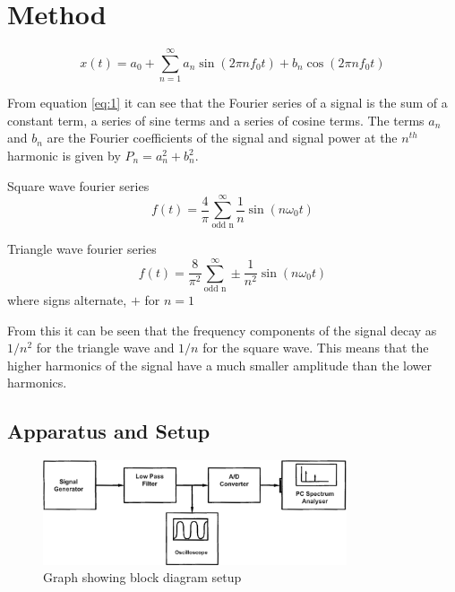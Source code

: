 \documentclass[12pt]{article}
\begin{document}
\section{Method}

\begin{equation}
    x(t) = a_0 + \sum_{n=1}^{\infty} a_n \sin(2\pi n f_0 t) + b_n \cos(2\pi n f_0 t)
    \label{eq:1}
\end{equation}

From equation \ref{eq:1} it can see that the Fourier series of a signal is the sum of a constant term, a series of sine terms and a series of cosine terms. 
The terms $a_n$ and $b_n$ are the Fourier coefficients of the signal and signal power at the $n^{th}$ harmonic is given by $P_n = a_n^2 + b_n^2$.

Square wave fourier series
\begin{equation}
    f(t) = \frac{4}{\pi} \sum_{\text{odd n}}^{\infty} \frac{1}{n} \sin\left(n \omega_0 t\right)
    \label{eq:2}
\end{equation}

Triangle wave fourier series
\begin{equation}
    f(t) = \frac{8}{\pi^2} \sum_{\text{odd n}}^{\infty} \pm \frac{1}{n^2} \sin\left(n\omega_0 t\right)
    \label{eq:3}
\end{equation}
where signs alternate, $+$ for $n = 1$

From this it can be seen that the frequency components of the signal decay as $1/n^2$ for the triangle wave and $1/n$ for the square wave. This means that the higher harmonics of the signal have a much smaller amplitude than the lower harmonics.


\subsection{Apparatus and Setup}

\begin{figure}[h]
    \centering
    \includegraphics[width=0.8\textwidth]{setup_diagram.png}
    \caption{Graph showing block diagram setup}
    \label{fig:setup}
\end{figure}
\end{document}
